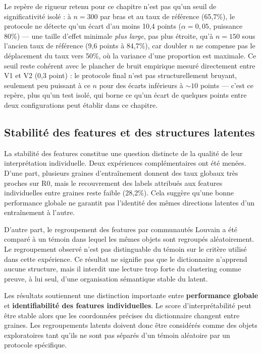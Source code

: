 \documentclass[11pt]{article}
\begin{document}
\begin{resultbox}
Le repère de rigueur retenu pour ce chapitre n'est pas qu'un seuil de
significativité isolé : à $n=300$ par bras et au taux de référence (65,7\%),
le protocole ne détecte qu'un écart d'au moins 10,4 points ($\alpha=0{,}05$,
puissance 80\%) --- une taille d'effet minimale \emph{plus large}, pas plus
étroite, qu'à $n=150$ sous l'ancien taux de référence (9,6 points à
84,7\%), car doubler $n$ ne compense pas le déplacement du taux vers 50\%,
où la variance d'une proportion est maximale. Ce seuil reste cohérent avec
le plancher de bruit empirique mesuré directement entre V1 et V2 (0,3 point)
: le protocole final n'est pas structurellement bruyant, seulement peu
puissant à ce $n$ pour des écarts inférieurs à ${\sim}10$ points --- c'est ce
repère, plus qu'un test isolé, qui borne ce qu'un écart de quelques points
entre deux configurations peut établir dans ce chapitre.
\end{resultbox}

\subsection{Stabilité des features et des structures latentes}
\label{subsec:reproductibilite}

La stabilité des features constitue une question distincte de la qualité de leur
interprétation individuelle. Deux expériences complémentaires ont été menées. D'une
part, plusieurs graines d'entraînement donnent des taux globaux très proches sur R0,
mais le recouvrement des labels attribués aux features individuelles entre graines
reste faible (28,2\%). Cela suggère qu'une bonne performance globale ne garantit pas
l'identité des mêmes directions latentes d'un entraînement à l'autre.

D'autre part, le regroupement des features par communautés Louvain a été comparé à un
témoin dans lequel les mêmes objets sont regroupés aléatoirement. Le regroupement
observé n'est pas distinguable du témoin sur le critère utilisé dans cette expérience.
Ce résultat ne signifie pas que le dictionnaire n'apprend aucune structure, mais il
interdit une lecture trop forte du clustering comme preuve, à lui seul, d'une
organisation sémantique stable du latent.

\begin{resultbox}
Les résultats soutiennent une distinction importante entre \textbf{performance globale}
et \textbf{identifiabilité des features individuelles}. Le score d'interprétabilité peut
être stable alors que les coordonnées précises du dictionnaire changent entre graines.
Les regroupements latents doivent donc être considérés comme des objets exploratoires
tant qu'ils ne sont pas séparés d'un témoin aléatoire par un protocole spécifique.
\end{resultbox}
\end{document}
